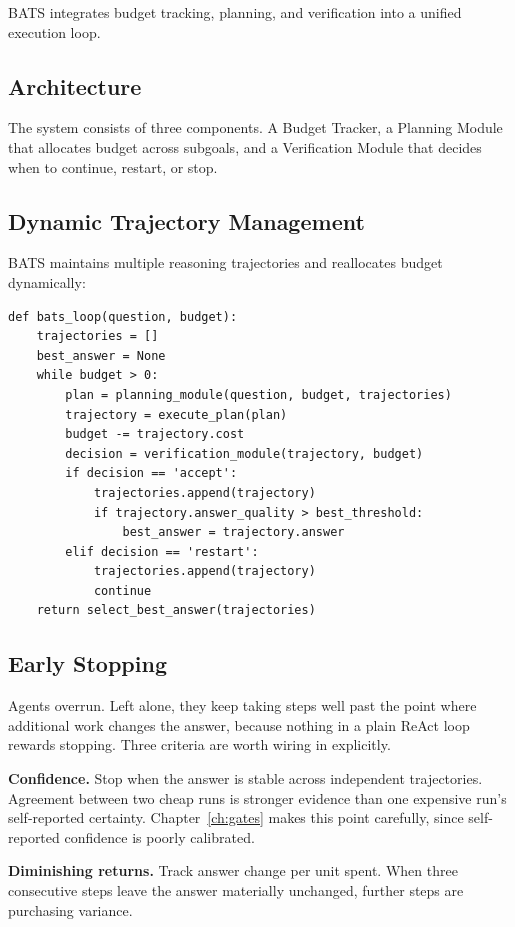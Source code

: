 BATS \cite{bats2025} integrates budget tracking, planning, and verification into a unified execution loop.

\subsection{Architecture}

The system consists of three components. A Budget Tracker, a Planning Module that allocates budget across subgoals, and a Verification Module that decides when to continue, restart, or stop.

\subsection{Dynamic Trajectory Management}

BATS maintains multiple reasoning trajectories and reallocates budget dynamically:

{\footnotesize
\begin{verbatim}
def bats_loop(question, budget):
    trajectories = []
    best_answer = None
    while budget > 0:
        plan = planning_module(question, budget, trajectories)
        trajectory = execute_plan(plan)
        budget -= trajectory.cost
        decision = verification_module(trajectory, budget)
        if decision == 'accept':
            trajectories.append(trajectory)
            if trajectory.answer_quality > best_threshold:
                best_answer = trajectory.answer
        elif decision == 'restart':
            trajectories.append(trajectory)
            continue
    return select_best_answer(trajectories)
\end{verbatim}
}

\subsection{Early Stopping}

Agents overrun. Left alone, they keep taking steps well past the point where
additional work changes the answer, because nothing in a plain ReAct loop rewards
stopping. Three criteria are worth wiring in explicitly.

\textbf{Confidence.} Stop when the answer is stable across independent
trajectories. Agreement between two cheap runs is stronger evidence than one
expensive run's self-reported certainty. Chapter~\ref{ch:gates} makes this point carefully, since self-reported confidence is poorly calibrated.

\textbf{Diminishing returns.} Track answer change per unit spent. When three
consecutive steps leave the answer materially unchanged, further steps are
purchasing variance.

